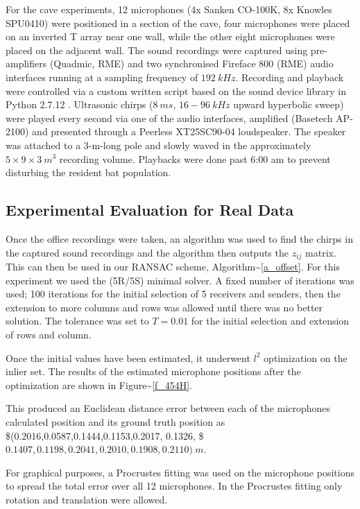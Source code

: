 \documentclass[
]{book}
\begin{document}
For the cave experiments, 12 microphones (4x Sanken CO-100K, 8x Knowles SPU0410) were positioned in a section of the cave, four microphones were placed on an inverted T array near one wall, while the other eight microphones were placed on the adjacent wall. The sound recordings were captured using pre-amplifiers (Quadmic, RME) and two synchronised Fireface 800 (RME) audio interfaces running at a sampling frequency of \(192 ~kHz\). Recording and playback were controlled via a custom written script based on the sound device library
\cite{geier2015} in Python 2.7.12 \cite{van1995python}. Ultrasonic chirps (\(8~ms\), \(16-96~kHz\) upward hyperbolic sweep) were played every second via one of the audio interfaces, amplified (Basetech AP-2100) and presented through a Peerless XT25SC90-04 loudspeaker. The speaker was attached to a 3-m-long pole and slowly waved in the approximately \(5 \times 9 \times 3 ~m^3\) recording volume. Playbacks were done past 6:00 am to prevent disturbing the resident bat population.

\vspace{-5pt}
\subsection{Experimental Evaluation for Real Data}
\vspace{-5pt}

Once the office recordings were taken, an algorithm was used to find the chirps in the captured sound recordings and the algorithm then outputs the \(z_{ij}\) matrix. This can then be used in our RANSAC scheme, Algorithm\textasciitilde{}\ref{a_offset}. For this experiment we used the (5R/5S) minimal solver. A fixed number of iterations was used; 100 iterations for the initial selection of 5 receivers and senders, then the extension to more columns and rows was allowed until there was no better solution. The tolerance was set to \(T=0.01\) for the initial selection and extension of rows and column.

Once the initial values have been estimated, it underwent \(l^{2}\) optimization on the inlier set. The results of the estimated microphone positions after the optimization are shown in Figure\textasciitilde{}\ref{f_454H}.

This produced an Euclidean distance error between each of the microphones calculated position and its ground truth position as \$(0.2016,0.0587,0.1444,0.1153,0.2017, 0.1326, \$ \(0.1407, 0.1198,0.2041,0.2010,0.1908,0.2110)~ m\).

For graphical purposes, a Procrustes fitting was used on the microphone positions to spread the total error over all 12 microphones. In the Procrustes fitting only rotation and translation were allowed.
\end{document}
